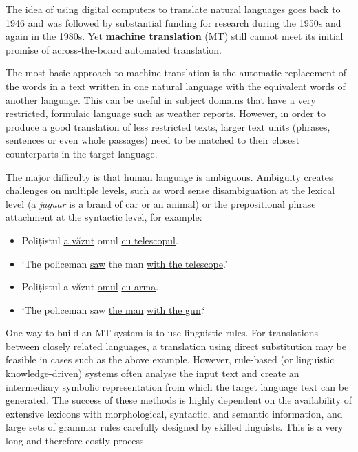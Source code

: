\begin{multicols}{2}
The idea of using digital computers to translate natural languages goes back to 1946 and was followed by substantial funding for research during the 1950s and again in the 1980s. Yet \textbf{machine translation} (MT) still cannot meet its initial promise of across-the-board automated translation. 

The most basic approach to machine translation is the automatic replacement of the words in a text written in one natural language with the equivalent words of another language. This can be useful in subject domains that have a very restricted, formulaic language such as weather reports.
However, in order to produce a good translation of less restricted texts, larger text units (phrases, sentences or even whole passages) need to be matched to their closest counterparts in the target language.


The major difficulty is that human language is ambiguous. Ambiguity creates challenges on multiple levels, such as word sense disambiguation at the lexical level (a \textit{jaguar} is a brand of car or an animal) or the prepositional phrase attachment at the syntactic level, for example:

\begin{example}
\begin{itemize}
\item []Polițistul \underline{a văzut} omul \underline{cu telescopul}.
\item []`The policeman \underline{saw} the man \underline{with the telescope}.'
\end{itemize}
\end{example}

\begin{example}
\begin{itemize}
\item []Polițistul a văzut \underline{omul} \underline{cu arma}.
\item []`The policeman saw \underline{the man} \underline{with the gun}.`
\end{itemize}
\end{example}

One way to build an MT system is to use linguistic rules. For translations between closely related languages, a translation using direct substitution may be feasible in cases such as the above example. However, rule-based (or linguistic knowledge-driven) systems often analyse the input text and create an intermediary symbolic representation from which the target language text can be generated. The success of these methods is highly dependent on the availability of extensive lexicons with morphological, syntactic, and semantic information, and large sets of grammar rules carefully designed by skilled linguists. This is a very long and therefore costly process.


\end{multicols}
